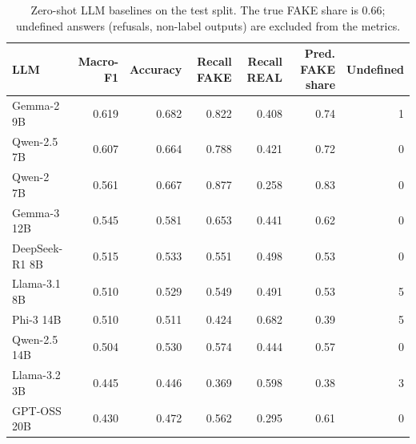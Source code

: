 \begin{table}[t]
\centering
\small
\caption{Zero-shot LLM baselines on the test split. The true FAKE share is 0.66; undefined answers (refusals, non-label outputs) are excluded from the metrics.}
\label{tab:b-zero-shot}
\begin{tabular}{lrrrrrr}
\toprule
LLM & Macro-F1 & Accuracy & Recall FAKE & Recall REAL & Pred. FAKE share & Undefined \\
\midrule
Gemma-2 9B & 0.619 & 0.682 & 0.822 & 0.408 & 0.74 & 1 \\
Qwen-2.5 7B & 0.607 & 0.664 & 0.788 & 0.421 & 0.72 & 0 \\
Qwen-2 7B & 0.561 & 0.667 & 0.877 & 0.258 & 0.83 & 0 \\
Gemma-3 12B & 0.545 & 0.581 & 0.653 & 0.441 & 0.62 & 0 \\
DeepSeek-R1 8B & 0.515 & 0.533 & 0.551 & 0.498 & 0.53 & 0 \\
Llama-3.1 8B & 0.510 & 0.529 & 0.549 & 0.491 & 0.53 & 5 \\
Phi-3 14B & 0.510 & 0.511 & 0.424 & 0.682 & 0.39 & 5 \\
Qwen-2.5 14B & 0.504 & 0.530 & 0.574 & 0.444 & 0.57 & 0 \\
Llama-3.2 3B & 0.445 & 0.446 & 0.369 & 0.598 & 0.38 & 3 \\
GPT-OSS 20B & 0.430 & 0.472 & 0.562 & 0.295 & 0.61 & 0 \\
\bottomrule
\end{tabular}
\end{table}
